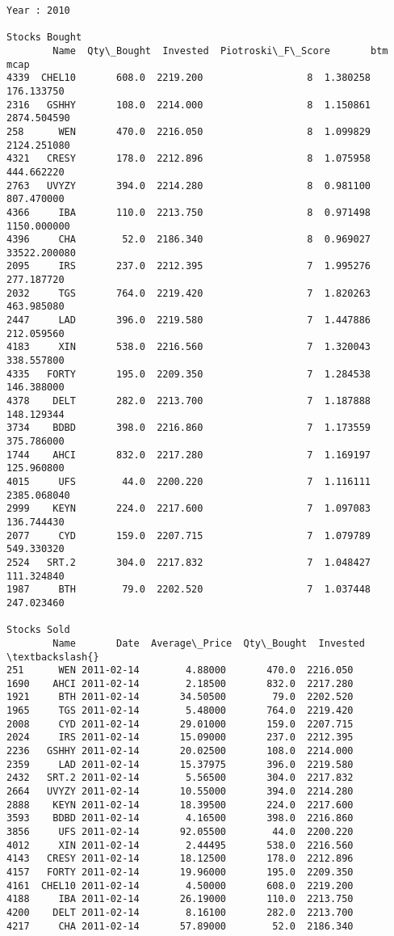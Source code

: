 \documentclass[11pt]{article}
\begin{document}
\begin{Verbatim}[commandchars=\\\{\}]
 Year : 2010

Stocks Bought
        Name  Qty\_Bought  Invested  Piotroski\_F\_Score       btm          mcap
4339  CHEL10       608.0  2219.200                  8  1.380258    176.133750
2316   GSHHY       108.0  2214.000                  8  1.150861   2874.504590
258      WEN       470.0  2216.050                  8  1.099829   2124.251080
4321   CRESY       178.0  2212.896                  8  1.075958    444.662220
2763   UVYZY       394.0  2214.280                  8  0.981100    807.470000
4366     IBA       110.0  2213.750                  8  0.971498   1150.000000
4396     CHA        52.0  2186.340                  8  0.969027  33522.200080
2095     IRS       237.0  2212.395                  7  1.995276    277.187720
2032     TGS       764.0  2219.420                  7  1.820263    463.985080
2447     LAD       396.0  2219.580                  7  1.447886    212.059560
4183     XIN       538.0  2216.560                  7  1.320043    338.557800
4335   FORTY       195.0  2209.350                  7  1.284538    146.388000
4378    DELT       282.0  2213.700                  7  1.187888    148.129344
3734    BDBD       398.0  2216.860                  7  1.173559    375.786000
1744    AHCI       832.0  2217.280                  7  1.169197    125.960800
4015     UFS        44.0  2200.220                  7  1.116111   2385.068040
2999    KEYN       224.0  2217.600                  7  1.097083    136.744430
2077     CYD       159.0  2207.715                  7  1.079789    549.330320
2524   SRT.2       304.0  2217.832                  7  1.048427    111.324840
1987     BTH        79.0  2202.520                  7  1.037448    247.023460

Stocks Sold
        Name       Date  Average\_Price  Qty\_Bought  Invested  \textbackslash{}
251      WEN 2011-02-14        4.88000       470.0  2216.050
1690    AHCI 2011-02-14        2.18500       832.0  2217.280
1921     BTH 2011-02-14       34.50500        79.0  2202.520
1965     TGS 2011-02-14        5.48000       764.0  2219.420
2008     CYD 2011-02-14       29.01000       159.0  2207.715
2024     IRS 2011-02-14       15.09000       237.0  2212.395
2236   GSHHY 2011-02-14       20.02500       108.0  2214.000
2359     LAD 2011-02-14       15.37975       396.0  2219.580
2432   SRT.2 2011-02-14        5.56500       304.0  2217.832
2664   UVYZY 2011-02-14       10.55000       394.0  2214.280
2888    KEYN 2011-02-14       18.39500       224.0  2217.600
3593    BDBD 2011-02-14        4.16500       398.0  2216.860
3856     UFS 2011-02-14       92.05500        44.0  2200.220
4012     XIN 2011-02-14        2.44495       538.0  2216.560
4143   CRESY 2011-02-14       18.12500       178.0  2212.896
4157   FORTY 2011-02-14       19.96000       195.0  2209.350
4161  CHEL10 2011-02-14        4.50000       608.0  2219.200
4188     IBA 2011-02-14       26.19000       110.0  2213.750
4200    DELT 2011-02-14        8.16100       282.0  2213.700
4217     CHA 2011-02-14       57.89000        52.0  2186.340


\end{Verbatim}
\end{document}
